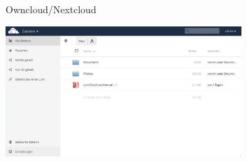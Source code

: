 \begin{frame}{Owncloud/Nextcloud}
  \begin{center}
    \includegraphics[width=9cm]{img/owncloud-screenshot.jpg}
  \end{center}
\end{frame}
